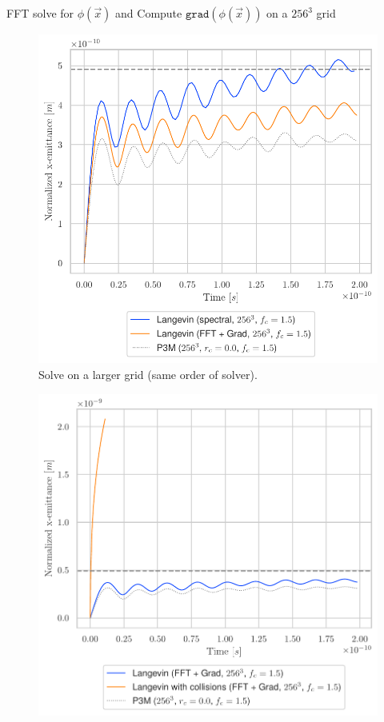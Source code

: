 \begin{frame}[t]{FFT solve for $\phi(\vec{x})$ and Compute $\texttt{grad}(\phi(\vec{x}))$ on a $256^3$ grid}
    \begin{multicols}{2}
    \begin{figure}[!htb]
        \centering
        \captionsetup{justification=centering}
      \includegraphics[width=1.0\linewidth]{figures/comparison_spectral_grad_256_emittance.pdf}
        \caption{Solve on a larger grid (same order of solver).} 
      \label{fig:awesome_image6}
    \end{figure}
    \columnbreak
    \begin{figure}[!htb]
        \centering
        \captionsetup{justification=centering}
      \includegraphics[width=1.0\linewidth]{figures/grid256_dragDiff.pdf}

\end{figure}
\end{multicols}
\end{frame}
